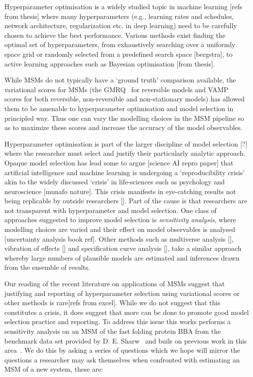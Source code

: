 \documentclass[journal=jacsat,manuscript=article]{achemso}
\begin{document}
Hyperparameter optimisation is a widely studied topic in machine learning [refs from thesis] where many hyperparameters (e.g., learning rates and schedules, network architecture, regularization etc. in deep learning) need to be carefully chosen to achieve the best performance. Various methods exist finding the optimal set of hyperparameters, from exhaustively searching over a uniformly space grid or randomly selected from a predefined search space [bergstra], to active learning approaches such as Bayesian optimisation [from thesis]. 

While MSMs do not typically have a `ground truth' comparison available, the variational scores for MSMs (the GMRQ~\cite{mcgibbonVariationalCrossvalidationSlow2015} for reversible models and VAMP~\cite{ wuVariationalApproachLearning2020c, scherer_variational_2019} scores for both reversible, non-reversible and non-stationary models) has allowed them to be amenable to hyperparameter optimisation and model selection in principled way. Thus one can vary the modelling choices in the MSM pipeline so as to maximize these scores and increase the accuracy of the model observables. 

Hyperparameter optimisation is part of the larger discipline of model selection [?] where the researcher must select and justify their particularly analytic approach. Opaque model selection has lead some to argue [science AI repro paper] that artificial intelligence and machine learning is undergoing a `reproducibility crisis' akin to the widely discussed `crisis' in life-sciences such as psychology and neuroscience [munafo nature]. This crisis manifests in eye-catching results not being replicable by outside researchers []. Part of the cause is that researchers are not transparent with hyperparameter and model selection. 
One class of approaches  suggested to improve model selection  is \emph{sensitivity analysis}, where modelling choices are varied and their effect on model observables is analysed [uncertainty analysis book ref]. Other methods such as multiverse analysis [], vibration of effects [] and specification curve analysis [], take a similar approach whereby large numbers of plausible models are estimated and inferences drawn from the ensemble of results. 

Our reading of the recent literature on applications of MSMs suggest that justifying and reporting of hyperparameter selection using variational scores or other methods is rare[refs from excel].  While we do not suggest that this constitutes a crisis, it does suggest that more can be done to promote good model selection practice and reporting.  To address this issue this works performs a sensitivity analysis on an MSM of the fast folding protein BBA from the benchmark data set provided by D. E. Sharw~\cite{lindorff-larsen_how_2011} and buils on previous work in this area~\cite{Optimized_2016}.  We do this by asking a series of questions which we hope will mirror the questions a researcher may ask themselves when confronted with estimating an MSM of a new system, these are: 
\end{document}
